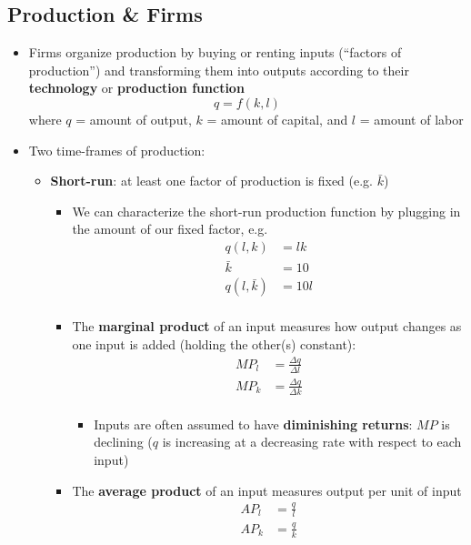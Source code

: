 \documentclass{article}
\begin{document}
\subsection*{Production \& Firms}
\begin{itemize}
	\item Firms organize production by buying or renting inputs (``factors of production'') and transforming them into outputs according to their \textbf{technology} or \textbf{production function} 
	\begin{equation*}
	q=f(k,l)	
	\end{equation*}
	where $q$ = amount of output, $k$ = amount of capital, and $l$ = amount of labor
	\item Two time-frames of production: 
	\begin{itemize}
		\item \textbf{Short-run}: at least one factor of production is fixed (e.g. $\bar{k}$)
		\begin{itemize}
			\item We can characterize the short-run production function by plugging in the amount of our fixed factor, e.g. 
			\begin{align*}
				q(l,k)&=lk\\
				\bar{k}&=10\\
				q(l,\bar{k})&=10l\\
			\end{align*}
			\item The \textbf{marginal product} of an input measures how output changes as one input is added (holding the other(s) constant): 
			\begin{align*}
			MP_l&=\frac{\Delta q}{\Delta l}\\
			MP_k&=\frac{\Delta q}{\Delta k}\\ 	
			\end{align*}
			\begin{itemize}
				\item Inputs are often assumed to have \textbf{diminishing returns}: $MP$ is declining ($q$ is increasing at a decreasing rate with respect to each input)
			\end{itemize}
		\item The \textbf{average product} of an input measures output per unit of input
		\begin{align*}
		AP_l&=\frac{q}{l}\\
		AP_k&=\frac{q}{k}\\	
		\end{align*}
		

\end{itemize}
\end{itemize}
\end{itemize}
\end{document}
